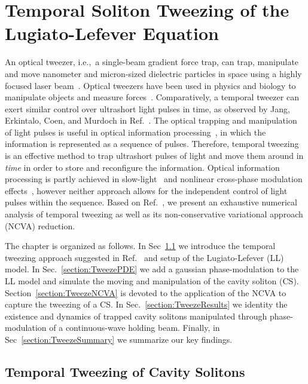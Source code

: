 \chapter{Temporal Soliton Tweezing of the Lugiato-Lefever Equation}
\label{chap:Tweeze}

An optical tweezer, i.e.,~a single-beam gradient force trap, can trap, manipulate and move nanometer and micron-sized dielectric particles in space using a highly focused laser beam~\cite{Ashkin1970,Ashkin1986}.  Optical tweezers have been used in physics and biology to manipulate objects and measure forces~\cite{ChuOpt}.  Comparatively, a temporal tweezer can exert similar control over ultrashort light pulses in time, as observed by Jang, Erkintalo, Coen, and Murdoch in Ref.~\cite{tweeze}.  The optical trapping and manipulation of light pulses is useful in optical information processing~\cite{info1, info2, info3, info4}, in which the information is represented as a sequence of pulses.  Therefore, temporal tweezing is an effective method to trap ultrashort pulses of light and move them around in {\em time} in order to store and reconfigure the information.  Optical information processing is partly achieved in slow-light~\cite{info5, info6, info7, info8} and nonlinear cross-phase modulation effects~\cite{info9, info10, info11, info12, info13, info14}, however neither approach allows for the independent control of light pulses within the sequence.  
Based on Ref.~\cite{tweeze}, we present an exhaustive numerical analysis of temporal tweezing as well as its non-conservative variational approach (NCVA) reduction.  

The chapter is organized as follows.  In Sec~\ref{section:TTweeze} we introduce the temporal tweezing approach suggested in Ref.~\cite{tweeze} and setup of the Lugiato-Lefever (LL) model.  In Sec.~\ref{section:TweezePDE} we add a gaussian phase-modulation to the LL model and simulate the moving and manipulation of the cavity soliton (CS).  Section~\ref{section:TweezeNCVA} is devoted to the application of the NCVA to capture the tweezing of a CS.  In Sec.~\ref{section:TweezeResults} we identity the existence and dynamics of trapped cavity solitons manipulated through phase-modulation of a continuous-wave holding beam.  Finally, in Sec~\ref{section:TweezeSummary} we summarize our key findings.

\section[Temporal Tweezing of Cavity Solitons]{Temporal Tweezing of Cavity Solitons} \label{section:TTweeze}


